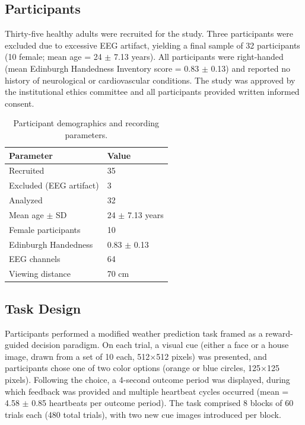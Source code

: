 \documentclass[12pt]{article}
\begin{document}
\subsection{Participants}

Thirty-five healthy adults were recruited for the study. Three participants were excluded due to excessive EEG artifact, yielding a final sample of 32 participants (10 female; mean age = 24 $\pm$ 7.13 years). All participants were right-handed (mean Edinburgh Handedness Inventory score = 0.83 $\pm$ 0.13) and reported no history of neurological or cardiovascular conditions. The study was approved by the institutional ethics committee and all participants provided written informed consent.

\begin{table}[ht]
\centering
\caption{Participant demographics and recording parameters.}
\label{tab:participants}
\begin{tabular}{ll}
\toprule
Parameter & Value \\
\midrule
Recruited & 35 \\
Excluded (EEG artifact) & 3 \\
Analyzed & 32 \\
Mean age $\pm$ SD & 24 $\pm$ 7.13 years \\
Female participants & 10 \\
Edinburgh Handedness & 0.83 $\pm$ 0.13 \\
EEG channels & 64 \\
Viewing distance & 70 cm \\
\bottomrule
\end{tabular}
\end{table}

\subsection{Task Design}

Participants performed a modified weather prediction task framed as a reward-guided decision paradigm. On each trial, a visual cue (either a face or a house image, drawn from a set of 10 each, 512$\times$512 pixels) was presented, and participants chose one of two color options (orange or blue circles, 125$\times$125 pixels). Following the choice, a 4-second outcome period was displayed, during which feedback was provided and multiple heartbeat cycles occurred (mean = 4.58 $\pm$ 0.85 heartbeats per outcome period). The task comprised 8 blocks of 60 trials each (480 total trials), with two new cue images introduced per block.
\end{document}
